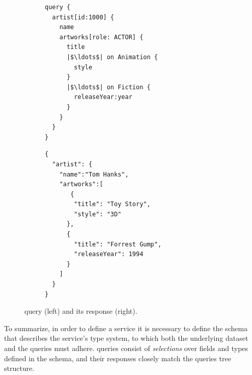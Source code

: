 

\begin{figure}
\centering
\begin{subfigure}{.25\textwidth}
\begin{verbatim}
query {
  artist[id:1000] {
    name
    artworks[role: ACTOR] {
      title
      |$\ldots$| on Animation {
        style
      }
      |$\ldots$| on Fiction {
        releaseYear:year
      }
    }
  }
}

\end{verbatim}
\label{fig:query_ex}
\end{subfigure}%
\begin{subfigure}{.25\textwidth}
\begin{verbatim}
{
  "artist": {
    "name":"Tom Hanks",
    "artworks":[
       {
        "title": "Toy Story",
        "style": "3D"
      },
      {
        "title": "Forrest Gump",
        "releaseYear": 1994
      }
    ]
  }
}
\end{verbatim}
\label{fig:response_ex}
\end{subfigure}
\caption{\gql query (left) and its response (right).}
\label{fig:qres_ex}
\end{figure}




To summarize,
in order to define a \gql service it is necessary to define the schema that describes the service's type system, 
to which both the underlying dataset and the queries must adhere. \gql queries consist of {\em selections} over fields and types defined in the schema, and their responses closely match the queries tree structure.
